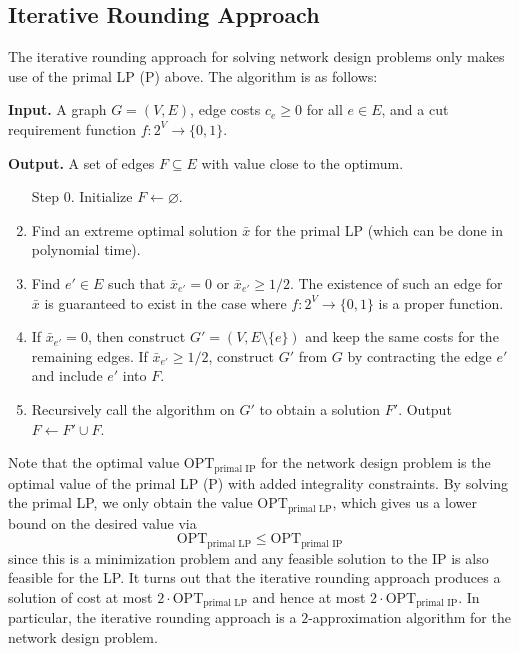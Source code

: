 \subsection{Iterative Rounding Approach} \label{subsec:7.3}
The iterative rounding approach for solving network design problems 
only makes use of the primal LP (P) above. The algorithm is
as follows: 
\begin{mdframed}[
    linewidth=1pt,
    linecolor=black,
    bottomline=false,topline=false,rightline=false,
    innerrightmargin=0pt,innertopmargin=0pt,innerbottommargin=0pt,
    innerleftmargin=1em,%
    skipabove=0.75\baselineskip
]
{\bf Input.} A graph $G = (V, E)$, edge costs $c_e \geq 0$ for 
all $e \in E$, and a cut requirement function $f : 2^V \to \{0, 1\}$. 

{\bf Output.} A set of edges $F \subseteq E$ with value close to the optimum.
\begin{enumerate}[leftmargin=1.75cm, label={Step \arabic*.}]
    \item [{Step 0.}] Initialize $F \gets \varnothing$.
    \item Find an extreme optimal solution $\bar{x}$ for the primal LP
    (which can be done in polynomial time).

    \item Find $e' \in E$ such that $\bar{x}_{e'} = 0$ or $\bar{x}_{e'} \geq 1/2$.
    The existence of such an edge for $\bar{x}$ is guaranteed to 
    exist in the case where $f : 2^V \to \{0, 1\}$ is a proper function.

    \item If $\bar{x}_{e'} = 0$, then construct $G' = (V, E \setminus \{e\})$
    and keep the same costs for the remaining edges. 
    If $\bar{x}_{e'} \geq 1/2$, construct $G'$ from $G$ by contracting the 
    edge $e'$ and include $e'$ into $F$. 

    \item Recursively call the algorithm on $G'$ to obtain a solution $F'$. 
    Output $F \gets F' \cup F$. 
\end{enumerate}
\end{mdframed}\vspace{-0.25cm}
Note that the optimal value $\text{OPT}_{\text{primal IP}}$ for the network 
design problem is the optimal value of the primal LP (P) with added 
integrality constraints. By solving the primal LP, we only obtain 
the value $\text{OPT}_{\text{primal LP}}$, which gives us a lower
bound on the desired value via
\[ \text{OPT}_{\text{primal LP}} \leq \text{OPT}_{\text{primal IP}} \] 
since this is a minimization problem and any feasible solution to the IP is 
also feasible for the LP. It turns out that the iterative rounding 
approach produces a solution of cost at most $2 \cdot \text{OPT}_{\text{primal LP}}$
and hence at most $2 \cdot \text{OPT}_{\text{primal IP}}$. In particular, 
the iterative rounding approach is a $2$-approximation algorithm for the 
network design problem.

